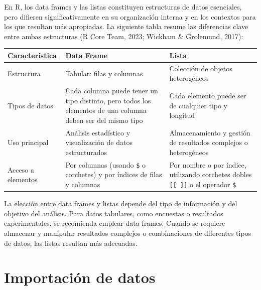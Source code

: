 \documentclass[
  spanish,
  a4paper,
  DIV=11,
  numbers=noendperiod,
  onepage,
  openany]{scrreprt}
\begin{document}
En R, los data frames y las listas constituyen estructuras de datos
esenciales, pero difieren significativamente en su organización interna
y en los contextos para los que resultan más apropiadas. La siguiente
tabla resume las diferencias clave entre ambas estructuras (R Core Team,
2023; Wickham \& Grolemund, 2017):

\begin{longtable}[]{@{}
  >{\raggedright\arraybackslash}p{}
  >{\raggedright\arraybackslash}p{}
  >{\raggedright\arraybackslash}p{}@{}}
\toprule\noalign{}
\begin{minipage}[b]{\linewidth}\raggedright
Característica
\end{minipage} & \begin{minipage}[b]{\linewidth}\raggedright
Data Frame
\end{minipage} & \begin{minipage}[b]{\linewidth}\raggedright
Lista
\end{minipage} \\
\midrule\noalign{}
\endhead
\bottomrule\noalign{}
\endlastfoot
Estructura & Tabular: filas y columnas & Colección de objetos
heterogéneos \\
Tipos de datos & Cada columna puede tener un tipo distinto, pero todos
los elementos de una columna deben ser del mismo tipo & Cada elemento
puede ser de cualquier tipo y longitud \\
Uso principal & Análisis estadístico y visualización de datos
estructurados & Almacenamiento y gestión de resultados complejos o
heterogéneos \\
Acceso a elementos & Por columnas (usando \texttt{\$} o corchetes) y por
índices de filas y columnas & Por nombre o por índice, utilizando
corchetes dobles \texttt{{[}{[}\ {]}{]}} o el operador \texttt{\$} \\
\end{longtable}

La elección entre data frames y listas depende del tipo de información y
del objetivo del análisis. Para datos tabulares, como encuestas o
resultados experimentales, se recomienda emplear data frames. Cuando se
requiere almacenar y manipular resultados complejos o combinaciones de
diferentes tipos de datos, las listas resultan más adecuadas.


\chapter{Importación de datos}\label{importaciuxf3n-de-datos}
\end{document}
